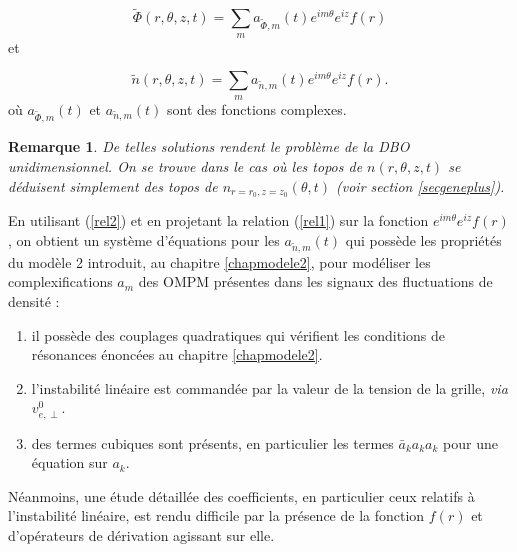 \documentclass{book}
\newtheorem{rem}{Remarque}[chapter]
\begin{document}
\begin{equation}
\tilde\Phi(r,\theta,z,t)= \sum_m a_{\tilde\Phi,m}(t)e^{i m\theta}e^{i
z}f(r) 
\end{equation}
et

\begin{equation}
\tilde n(r,\theta,z,t)=\sum_m a_{\tilde n,m}(t)e^{i m\theta}e^{i z}f(r).
\end{equation}
o\`u $a_{\tilde\Phi,m}(t)$ et $a_{\tilde n,m}(t)$ sont des fonctions
complexes.


\begin{rem}
De telles solutions rendent le probl\`eme de la DBO unidimensionnel. On
se trouve dans le cas o\`u les topos de $n(r,\theta,z,t)$ se d\'eduisent
simplement des topos de $n_{r=r_0,z=z_0}(\theta,t)$ (voir section
\ref{secgeneplus}). 
\end{rem}
En utilisant (\ref{rel2}) et en projetant la relation (\ref{rel1})
sur la fonction $e^{i m\theta}e^{i z}f(r)$, on obtient un syst\`eme
d'\'equations pour les $a_{\tilde n,m}(t)$  qui poss\`ede les
propri\'et\'es du 
mod\`ele 2 introduit, au chapitre \ref{chapmodele2}, pour mod\'eliser
les complexifications $a_m$ des OMPM pr\'esentes dans les signaux des
fluctuations de densit\'e : 
\begin{enumerate}
\item il poss\`ede des
couplages quadratiques qui v\'erifient les conditions
de r\'esonances 
\'enonc\'ees au chapitre \ref{chapmodele2}.
\item l'instabilit\'e lin\'eaire est command\'ee par la valeur de la
tension de la grille, {\it via} $v_{e,\perp}^0$.
\item des termes cubiques sont pr\'esents, en particulier les termes
$\bar a_k a_k a_k$ pour une \'equation sur $a_k$.
\end{enumerate}

N\'eanmoins, une \'etude d\'etaill\'ee des coefficients, en
particulier ceux relatifs \`a l'instabilit\'e lin\'eaire, est rendu
difficile par la pr\'esence de la fonction $f(r)$ et d'op\'erateurs de
d\'erivation agissant sur elle.
\end{document}
